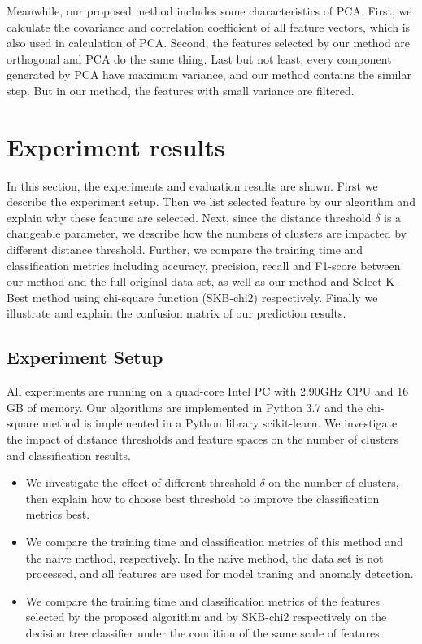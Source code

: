 \documentclass{ieeeaccess}
\theoremstyle{definition}
\begin{document}
Meanwhile, our proposed method includes some characteristics of PCA. First, we calculate the covariance and correlation coefficient of all feature vectors, which is also used in calculation of PCA. Second, the features selected by our method are orthogonal and PCA do the same thing. Last but not least, every component generated by PCA have maximum variance, and our method contains the similar step. But in our method, the features with small variance are filtered.

\section{Experiment results}
\label{sec:evaluation}

In this section, the experiments and evaluation results are shown. First we describe the experiment setup. Then we list selected feature by our algorithm and explain why these feature are selected. Next, since the distance threshold $\delta$ is a changeable parameter, we describe how the numbers of clusters are impacted by different distance threshold. Further, we compare the training time and classification metrics including accuracy, precision, recall and F1-score between our method and the full original data set, as well as our method and Select-K-Best method using chi-square function (SKB-chi2) respectively. Finally we illustrate and explain the confusion matrix of our prediction results.

\subsection{Experiment Setup}

All experiments are running on a quad-core Intel PC with 2.90GHz CPU and 16 GB of memory. Our algorithms are implemented in Python 3.7 and the chi-square method is implemented in a Python library scikit-learn\cite{sklearn}. We investigate the impact of distance thresholds and feature spaces on the number of clusters and classification results.

\begin{itemize}
    \item We investigate the effect of different threshold $\delta$ on the number of clusters, then explain how to choose best threshold to improve the classification metrics best.
    \item We compare the training time and classification metrics of this method and the naive method, respectively. In the naive method, the data set is not processed, and all features are used for model traning and anomaly detection.
    \item We compare the training time and classification metrics of the features selected by the proposed algorithm and by SKB-chi2 respectively on the decision tree classifier under the condition of the same scale of features.
\end{itemize}
\end{document}
